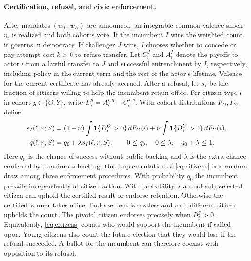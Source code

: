 \documentclass[11pt,letterpaper]{article}
\begin{document}
\paragraph{Certification, refusal, and civic enforcement.}
After mandates $(w_L,w_R)$ are announced, an integrable common valence shock $\eta_t$ is realized and both cohorts vote. If the incumbent $I$ wins the weighted count, it governs in democracy. If challenger $J$ wins, $I$ chooses whether to concede or pay attempt cost $k>0$ to refuse transfer. Let $C_i^J$ and $A_i^I$ denote the payoffs to actor $i$ from a lawful transfer to $J$ and successful entrenchment by $I$, respectively, including policy in the current term and the rest of the actor's lifetime. Valence for the current certificate has already accrued. After a refusal, let $s_I$ be the fraction of citizens willing to help the incumbent retain office. For citizen type $i$ in cohort $g\in\{O,Y\}$, write $D_i^g=A_i^{I,g}-C_i^{J,g}$. With cohort distributions $F_O,F_Y$, define
\begin{equation}
 \begin{aligned}
 s_I(\ell,r;S)&=(1-\nu)\int {\bf1}\{D_i^O>0\}\,dF_O(i)
                 +\nu\int {\bf1}\{D_i^Y>0\}\,dF_Y(i),\\
 q(\ell,r;S)&=q_0+\lambda s_I(\ell,r;S),\qquad
 0\le q_0,\quad 0\le\lambda,\quad q_0+\lambda\le1 .
 \end{aligned}\label{eq:citizens}
\end{equation}
Here $q_0$ is the chance of success without public backing and $\lambda$ is the extra chance conferred by unanimous backing. One implementation of \eqref{eq:citizens} is a random draw among three enforcement procedures. With probability $q_0$ the incumbent prevails independently of citizen action. With probability $\lambda$ a randomly selected citizen can uphold the certified result or endorse retention. Otherwise the certified winner takes office. Endorsement is costless and an indifferent citizen upholds the count. The pivotal citizen endorses precisely when $D_i^g>0$. Equivalently, \eqref{eq:citizens} counts who would support the incumbent if called upon. Young citizens also count the future election that they would lose if the refusal succeeded. A ballot for the incumbent can therefore coexist with opposition to its refusal.
\end{document}
